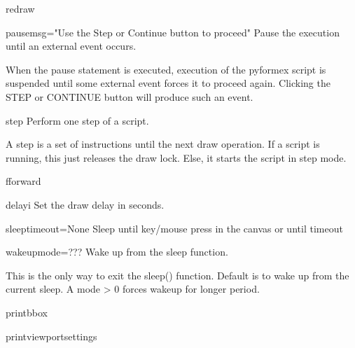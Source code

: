 \begin{funcdesc}{redraw}{}


\end{funcdesc}


\begin{funcdesc}{pause}{msg="Use the Step or Continue button to proceed"}
Pause the execution until an external event occurs.

    When the pause statement is executed, execution of the pyformex script
    is suspended until some external event forces it to proceed again.
    Clicking the STEP or CONTINUE button will produce such an event.
    

\end{funcdesc}


\begin{funcdesc}{step}{}
Perform one step of a script.

    A step is a set of instructions until the next draw operation.
    If a script is running, this just releases the draw lock.
    Else, it starts the script in step mode.
    

\end{funcdesc}


\begin{funcdesc}{fforward}{}


\end{funcdesc}


\begin{funcdesc}{delay}{i}
Set the draw delay in seconds.

\end{funcdesc}


\begin{funcdesc}{sleep}{timeout=None}
Sleep until key/mouse press in the canvas or until timeout

\end{funcdesc}


\begin{funcdesc}{wakeup}{mode=???}
Wake up from the sleep function.

    This is the only way to exit the sleep() function.
    Default is to wake up from the current sleep. A mode > 0
    forces wakeup for longer period.
    

\end{funcdesc}


\begin{funcdesc}{printbbox}{}


\end{funcdesc}


\begin{funcdesc}{printviewportsettings}{}


\end{funcdesc}


